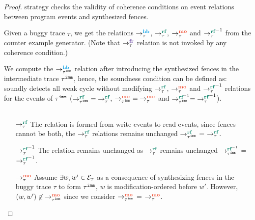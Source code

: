 { \label{thm:weak-sound}}
\begin{proof}
	\wkfence strategy checks the validity of coherence conditions
	on event relations between program events and synthesized
	fences.
	
	Given a buggy trace $\tau$, we get the relations $\setHB$,
	$\setRF$, $\setMO$ and $\setRF^{-1}$ from the counter
	example generator.
	(Note that $\setFR$ relation is not invoked by any 
	coherence condition.)
	
	We compute the $\hb{\imm{\tau}}{}{}$ relation after introducing 
	the synthesized fences in the intermediate trace ${\tau}^{\mathtt{imm}}$, 
	hence, the soundness condition can be defined as: 
	\ourtechnique soundly detects all weak cycle without modifying 
	$\setRF$, $\setMO$ and $\setRF^{-1}$ relations for the events of 
	${\tau}^{\mathtt{imm}}$ (\ie $\rf{\imm{\tau}}{}{} = \setRF$, 
	$\mo{\imm{\tau}}{}{} = \setMO$ and $\rfinv{\imm{\tau}}{}{} = 
	\setRF^{-1}$).
	
	\begin{figure}[h]
		\begin{tabular}{|c|c|c|c|}
			\hline
			\resizebox{0.19\textwidth}{!}{} &
			\resizebox{0.25\textwidth}{!}{} &
			\resizebox{0.25\textwidth}{!}{} &
			\resizebox{0.27\textwidth}{!}{} \\
			\hline
		\end{tabular}
		\label{fig:como}
	\end{figure}
	
	
	\begin{itemize}[label=setmm,align=left,leftmargin=*]
		\item [$\setRF$] The relation is formed from write events 
			to read events, since fences cannot be both, the $\setRF$
			relations remains unchanged \ie $\rf{\imm{\tau}}{}{}$ =
			$\setRF$.
		
		\item [$\setRF^{-1}$] The relation remains unchanged as 
			$\setRF$ remains unchanged \ie $\rfinv{\imm{\tau}}{}{}$ 
			= $\setRF^{-1}$.
		
		\item [$\setMO$] Assume $\exists w, w' \in \mathcal{E}_\tau$ \st 
			as a consequence of synthesizing fences in the buggy trace 
			$\tau$ to form ${\tau}^{\mathtt{imm}}$, $w$ is modification-ordered
			before $w'$. However, $(w,w') \nin \mo{\imm{\tau}}{}{}$
			since we consider $\mo{\imm{\tau}}{}{}$ = $\setMO$.
			

\end{itemize}
\end{proof}
